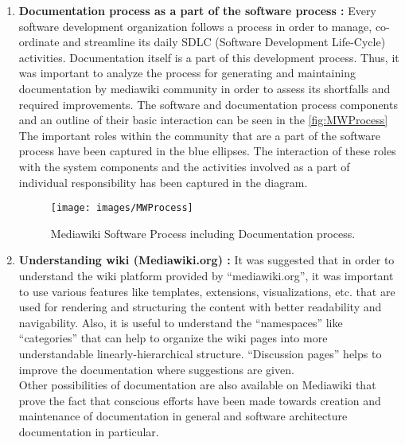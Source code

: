 \begin{enumerate}
\item \textbf{Documentation process as a part of the software process : } Every software development organization follows a process in order to manage, co-ordinate and streamline its daily SDLC (Software Development Life-Cycle) activities. Documentation itself is a part of this development process. Thus, it was important to analyze the process for generating and maintaining documentation by mediawiki community in order to assess its shortfalls and required improvements.
\indent The software and documentation process components and an outline of their basic interaction can be seen in the \autoref{fig:MWProcess}  The important roles within the community that are a part of the software process have been captured in the blue ellipses. The interaction of these roles with the system components and the activities involved as a part of individual responsibility has been captured in the diagram. 
\vspace{10mm}
\begin{figure}[H]
  \centering
  \texttt{[image: images/MWProcess]}
  \caption[Mediawiki Software Process including Documentation process]{Mediawiki Software Process including Documentation process.}\label{fig:MWProcess}
\end{figure}

\item \textbf{Understanding wiki (Mediawiki.org) : }It was suggested that in order to understand the wiki platform provided by \enquote{mediawiki.org}, it was important to use various features like templates, extensions, visualizations, etc. that are used for rendering and structuring the content with better readability and navigability. Also, it is useful to understand the \enquote{namespaces} like \enquote{categories} that can help to organize the wiki pages into more understandable linearly-hierarchical structure. \enquote{Discussion pages} helps to improve the documentation where suggestions are given.
\\\indent Other possibilities of documentation are also available on Mediawiki that prove the fact that conscious efforts have been made towards creation and maintenance of documentation in general and software architecture documentation in particular. 

\begin{itemize}


\end{itemize}
\end{enumerate}
